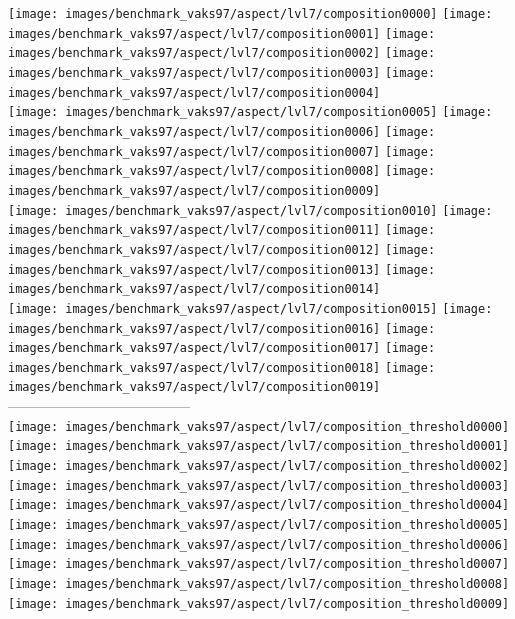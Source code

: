 \begin{itemize}
\begin{center}
\texttt{[image: images/benchmark\_vaks97/aspect/lvl7/composition0000]}
\texttt{[image: images/benchmark\_vaks97/aspect/lvl7/composition0001]}
\texttt{[image: images/benchmark\_vaks97/aspect/lvl7/composition0002]}
\texttt{[image: images/benchmark\_vaks97/aspect/lvl7/composition0003]}
\texttt{[image: images/benchmark\_vaks97/aspect/lvl7/composition0004]}\\
\texttt{[image: images/benchmark\_vaks97/aspect/lvl7/composition0005]}
\texttt{[image: images/benchmark\_vaks97/aspect/lvl7/composition0006]}
\texttt{[image: images/benchmark\_vaks97/aspect/lvl7/composition0007]}
\texttt{[image: images/benchmark\_vaks97/aspect/lvl7/composition0008]}
\texttt{[image: images/benchmark\_vaks97/aspect/lvl7/composition0009]}\\
\texttt{[image: images/benchmark\_vaks97/aspect/lvl7/composition0010]}
\texttt{[image: images/benchmark\_vaks97/aspect/lvl7/composition0011]}
\texttt{[image: images/benchmark\_vaks97/aspect/lvl7/composition0012]}
\texttt{[image: images/benchmark\_vaks97/aspect/lvl7/composition0013]}
\texttt{[image: images/benchmark\_vaks97/aspect/lvl7/composition0014]}\\
\texttt{[image: images/benchmark\_vaks97/aspect/lvl7/composition0015]}
\texttt{[image: images/benchmark\_vaks97/aspect/lvl7/composition0016]}
\texttt{[image: images/benchmark\_vaks97/aspect/lvl7/composition0017]}
\texttt{[image: images/benchmark\_vaks97/aspect/lvl7/composition0018]}
\texttt{[image: images/benchmark\_vaks97/aspect/lvl7/composition0019]}\\
---------------------------------------\\
\texttt{[image: images/benchmark\_vaks97/aspect/lvl7/composition\_threshold0000]}
\texttt{[image: images/benchmark\_vaks97/aspect/lvl7/composition\_threshold0001]}
\texttt{[image: images/benchmark\_vaks97/aspect/lvl7/composition\_threshold0002]}
\texttt{[image: images/benchmark\_vaks97/aspect/lvl7/composition\_threshold0003]}
\texttt{[image: images/benchmark\_vaks97/aspect/lvl7/composition\_threshold0004]}\\
\texttt{[image: images/benchmark\_vaks97/aspect/lvl7/composition\_threshold0005]}
\texttt{[image: images/benchmark\_vaks97/aspect/lvl7/composition\_threshold0006]}
\texttt{[image: images/benchmark\_vaks97/aspect/lvl7/composition\_threshold0007]}
\texttt{[image: images/benchmark\_vaks97/aspect/lvl7/composition\_threshold0008]}
\texttt{[image: images/benchmark\_vaks97/aspect/lvl7/composition\_threshold0009]}\\

\end{center}
\end{itemize}
